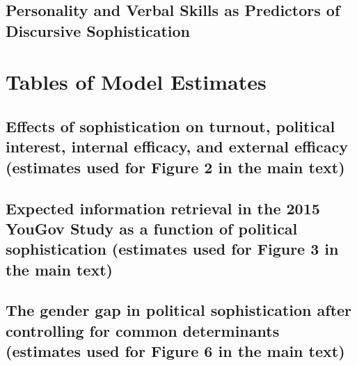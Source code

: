 \clearpage
\subsection{Personality and Verbal Skills as Predictors of Discursive Sophistication}\label{app:determinants_rob}




\clearpage
\section{Tables of Model Estimates}\label{app:tables}

\subsection{Effects of sophistication on turnout, political interest, internal efficacy, and external efficacy (estimates used for Figure 2 in the main text)}








\clearpage

\subsection{Expected information retrieval in the 2015 YouGov Study as a function of political sophistication (estimates used for Figure 3 in the main text)}

\clearpage

\subsection{The gender gap in political sophistication after controlling for common determinants (estimates used for Figure 6 in the main text)}





